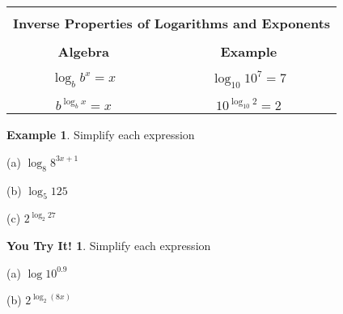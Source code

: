\documentclass{report}
\theoremstyle{definition}
\newtheorem{example}{\bf Example}
\newtheorem{youtry}{\bf You Try It!}
\begin{document}
\vspace{-0.5cm}

\begin{center}
	\large
	\begin{tabular}[t]{|c|c|}
		\hline
		\multicolumn{2}{|c|}{}\\
		\multicolumn{2}{|c|}{\textbf{ Inverse Properties of Logarithms and Exponents\large}}\\
		\hline
		&\\
		\qquad\qquad  \textbf{Algebra} \qquad\qquad\qquad&\textbf{Example}\\
		\hline
		&\\
		$\log_b b^x = x$ & $\log_{10} 10^7 = 7$\\
		\hline
		&\\
		$b^{\log_b x} = x$ & $10^{\log_{10} 2} = 2$\\
		\hline
	\end{tabular}
	\normalsize
\end{center}


\begin{example}
Simplify each expression
\end{example}

\begin{minipage}[t]{0.3\linewidth}
 (a)  $\log_8 8^{3x+1}$
\end{minipage}
\begin{minipage}[t]{0.3\linewidth}
 (b)  $\log_5 125$
\end{minipage}
\begin{minipage}[t]{0.3\linewidth}
 (c) $2^{\log_2 27}$
\end{minipage}
\vfill

\begin{youtry}
Simplify each expression
\end{youtry}

\begin{minipage}[t]{0.45\linewidth}
 (a) $\log 10^{0.9}$
\end{minipage}
\begin{minipage}[t]{0.45\linewidth}
 (b) $2^{\log_2 (8x)}$
\end{minipage}
\vfill


 \newpage
\end{document}
